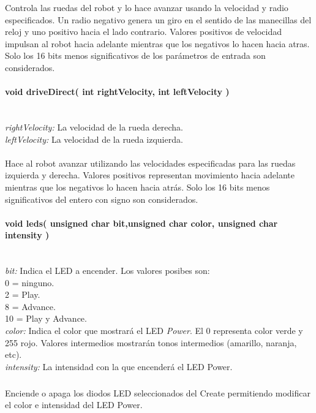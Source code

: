 \documentclass[letterpaper,openright,12pt]{book}
\begin{document}
Controla las ruedas del robot y lo hace avanzar usando la velocidad y radio especificados. Un radio negativo genera un giro en el sentido de las manecillas del reloj y uno positivo hacia el lado contrario. Valores positivos de velocidad impulsan al robot hacia adelante mientras que los negativos lo hacen hacia atras. Solo los 16 bits menos significativos de los parámetros de entrada son considerados.\\

\paragraph{void driveDirect( int rightVelocity, int leftVelocity )}\mbox{}\\
\emph{rightVelocity: }La velocidad de la rueda derecha.\\
\emph{leftVelocity: }La velocidad de la rueda izquierda.\\\\

Hace al robot avanzar utilizando las velocidades especificadas para las ruedas izquierda y derecha. Valores positivos representan movimiento hacia adelante mientras que los negativos lo hacen hacia atrás. Solo los 16 bits menos significativos del entero con signo son considerados.\\

\paragraph{void leds( unsigned char bit,unsigned char color, unsigned char intensity )} \mbox{}\\
\emph{bit: }Indica el LED a encender. Los valores posibes son:\\
0 = ninguno.\\
2 = Play.\\
8 = Advance.\\
10 = Play y Advance.\\
\emph{color: } Indica el color que mostrará el LED \emph{Power}. El 0 representa color verde y 255 rojo. Valores intermedios mostrarán tonos intermedios (amarillo, naranja, etc).\\
\emph{intensity: }La intensidad con la que encenderá el LED Power.\\\\

Enciende o apaga los diodos LED seleccionados del Create\textsuperscript{\textregistered} permitiendo modificar el color e intensidad del LED Power.\\
\end{document}
